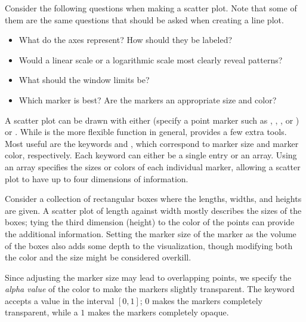 Consider the following questions when making a scatter plot.
Note that some of them are the same questions that should be asked when creating a line plot.
%
\begin{itemize}
    \item What do the axes represent? How should they be labeled?
    \item Would a linear scale or a logarithmic scale most clearly reveal patterns?
    \item What should the window limits be?
    \item Which marker is best? Are the markers an appropriate size and color?
\end{itemize}

A scatter plot can be drawn with either  (specify a point marker such as , , , or ) or .
While  is the more flexible function in general,  provides a few extra tools.
Most useful are the keywords  and , which correspond to marker size and marker color, respectively.
Each keyword can either be a single entry or an array.
Using an array specifies the sizes or colors of each individual marker, allowing a scatter plot to have up to four dimensions of information.

Consider a collection of rectangular boxes where the lengths, widths, and heights are given.
A scatter plot of length against width mostly describes the sizes of the boxes; tying the third dimension (height) to the color of the points can provide the additional information.
Setting the marker size of the marker as the volume of the boxes also adds some depth to the visualization, though modifying both the color and the size might be considered overkill.

Since adjusting the marker size may lead to overlapping points, we specify the \emph{alpha value} of the color to make the markers slightly transparent.
The keyword  accepts a value in the interval $[0,1]$; 0 makes the markers completely transparent, while a $1$ makes the markers completely opaque.

